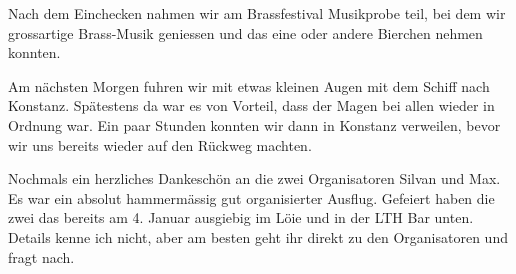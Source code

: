 \begin{history}
    Nach dem Einchecken nahmen wir am Brassfestival Musikprobe
    teil, bei dem wir grossartige Brass-Musik geniessen und das
    eine oder andere Bierchen nehmen konnten.

    Am nächsten Morgen fuhren wir mit etwas kleinen Augen mit dem
    Schiff nach Konstanz. Spätestens da war es von Vorteil, dass
    der Magen bei allen wieder in Ordnung war. Ein paar Stunden
    konnten wir dann in Konstanz verweilen, bevor wir uns bereits
    wieder auf den Rückweg machten.

    Nochmals ein herzliches Dankeschön an die zwei Organisatoren
    Silvan und Max. Es war ein absolut hammermässig gut
    organisierter Ausflug. Gefeiert haben die zwei das bereits am
    4. Januar ausgiebig im Löie und in der LTH Bar unten. Details
    kenne ich nicht, aber am besten geht ihr direkt zu den
    Organisatoren und fragt nach.


\end{history}

